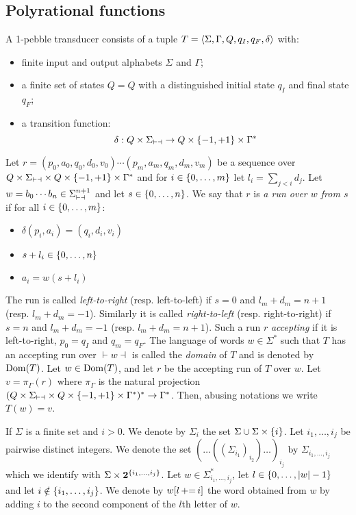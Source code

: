 \subsection{Polyrational functions}
\begin{definition}
A 1-pebble transducer consists of a tuple $T=\langle \Sigma,\Gamma,Q, q_I,q_F,\delta \rangle$ with:
\begin{itemize}
\item finite input and output alphabets $\Sigma$ and $\Gamma$;
\item a finite set of states $Q=Q$ with a distinguished initial state $q_I$ and final state $q_F$;
\item a transition function:
$$ \delta: Q\times \Sigma_{\vdash \dashv} \to Q\times\{-1,+1\}\times\Gamma^*$$
\end{itemize}
\end{definition}

Let $r=(p_0,a_0,q_0,d_0,v_0)\cdots (p_m,a_m,q_m,d_m,v_m)$ be a sequence over $Q\times \Sigma_{\vdash \dashv}\times Q\times \{-1,+1\}\times \Gamma^*$ and for $i\in \{0,\ldots,m\}$ let  $l_i=\sum_{j< i }d_j$.
Let $w=b_0\cdots b_n\in \Sigma_{\vdash \dashv}^{n+1}$ and let $s\in \{0,\ldots, n\}$. We say that $r$ is \emph{a run over $w$ from $s$} if for all $i\in \{0,\ldots,m\}$:

\begin{itemize}
\item $\delta(p_i,a_i)=(q_i,d_i,v_i)$
\item $s+l_i\in \{0,\ldots, n\}$
\item $a_i=w(s+l_i)$
\end{itemize}

The run is called \emph{left-to-right} (resp. left-to-left) if $s=0$ and $l_m+d_m=n+1$ (resp. $l_m+d_m=-1$). Similarly it is called \emph{right-to-left} (resp. right-to-right) if $s=n$ and $l_m+d_m=-1$ (resp. $l_m+d_m=n+1$).
Such a run $r$ \emph{accepting} if it is left-to-right, $p_0=q_I$ and $q_m=q_F$.
The language of words $w\in \Sigma^*$ such that $T$ has an accepting run over $\vdash w\dashv$ is called the \emph{domain} of $T$ and is denoted by $\operatorname{\mathrm{Dom}}(T)$. Let $w\in \operatorname{\mathrm{Dom}}(T)$, and let $r$ be the accepting run of $T$ over $w$. Let $v=\pi_\Gamma(r)$ where $\pi_\Gamma$ is the natural projection $(Q\times \Sigma_{\vdash \dashv} \times Q\times \{-1,+1\}\times \Gamma^*)^* \rightarrow \Gamma^*$.
Then, abusing notations we write $T(w)=v$.

If $\Sigma$ is a finite set and $i>0$. We denote by $\Sigma_i$ the set $\Sigma\cup \Sigma\times {\{i\}}$.
Let $i_1,\ldots,i_j$ be pairwise distinct integers. We denote the set $(\ldots((\Sigma_{i_1})_{i_2})\ldots)_{i_j}$ by $\Sigma_{i_1,\ldots,i_j}$ which we identify with $\Sigma\times \mathbf 2^{\{i_1,\ldots,i_j\}}$.
Let $w\in \Sigma_{i_1,\ldots,i_j}^*$, let $l\in \{0,\ldots,|w|-1\}$ and let $i\notin \{i_1,\ldots,i_j\}$.
We denote by $w[l\mathop{{+}{=}} i]$ the word obtained from $w$ by adding $i$ to the second component of the $l$th letter of $w$.

